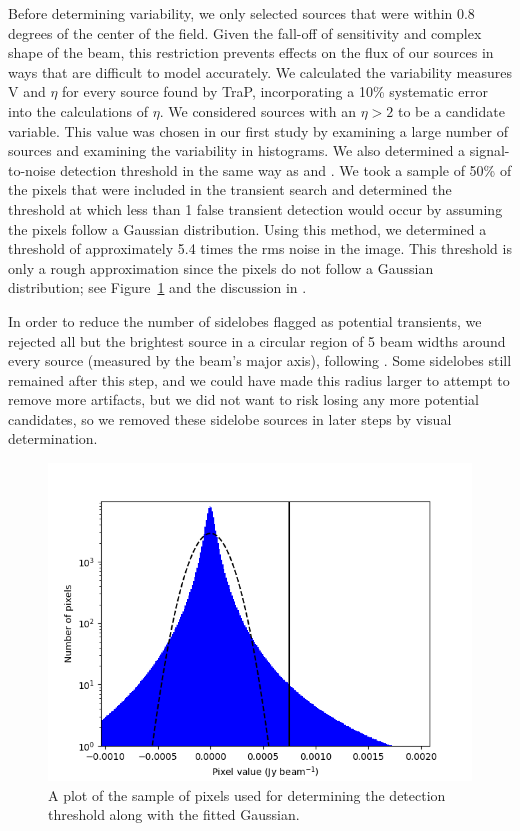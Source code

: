 \documentclass[12pt]{article}
\begin{document}
Before determining variability, we only selected sources that were within 0.8 degrees of the center of the field. Given the fall-off of sensitivity and complex shape of the beam, this restriction prevents effects on the flux of our sources in ways that are difficult to model accurately. We calculated the variability measures V and $\eta$ for every source found by TraP, incorporating a 10\% systematic error into the calculations of $\eta$. We considered sources with an $\eta > 2$ to be a candidate variable. This value was chosen in our first study \citep{commensal1} by examining a large number of sources and examining the variability in histograms.  We also determined a signal-to-noise detection threshold in the same way as \citet{2022MNRAS.517.2894R} and \citet{commensal1}. We took a sample of 50\% of the pixels that were included in the transient search and determined the threshold at which less than 1 false transient detection would occur by assuming the pixels follow a Gaussian distribution. Using this method, we determined a threshold of approximately 5.4 times the rms noise in the image. This threshold is only a rough approximation since the pixels do not follow a Gaussian distribution; see Figure~\ref{fig:pixels} and the discussion in \citet{2022MNRAS.517.2894R}. 

In order to reduce the number of sidelobes flagged as potential transients, we rejected all but the brightest source in a circular region of 5 beam widths around every source (measured by the beam's major axis), following \citet{commensal1}. Some sidelobes still remained after this step, and we could have made this radius larger to attempt to remove more artifacts, but we did not want to risk losing any more potential candidates, so we removed these sidelobe sources in later steps by visual determination.
\begin{figure}
	\includegraphics[width=\columnwidth]{pixels.png}
	\caption{A plot of the sample of pixels used for determining the detection threshold along with the fitted Gaussian.}
	\label{fig:pixels}
\end{figure}
\end{document}
